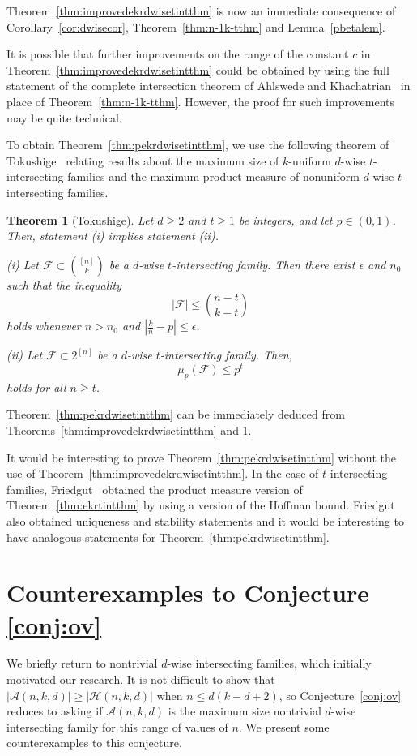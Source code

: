 \documentclass[12pt]{article}
\newtheorem{theorem}{Theorem}
\theoremstyle{definition}
\newcommand{\cH}{\mathcal{H}}
\newcommand{\cA}{\mathcal{A}}
\newcommand{\cF}{\mathcal{F}}
\begin{document}
Theorem~\ref{thm:improvedekrdwisetintthm} is now an immediate consequence of Corollary~\ref{cor:dwisecor}, Theorem~\ref{thm:n-1k-tthm} and Lemma~\ref{pbetalem}. 

It is possible that further improvements on the range of the constant $c$ in Theorem~\ref{thm:improvedekrdwisetintthm} could be obtained by using the full statement of the complete intersection theorem of Ahlswede and Khachatrian~\cite{AK1, AK3} in place of Theorem~\ref{thm:n-1k-tthm}. However, the proof for such improvements may be quite technical. 

To obtain Theorem~\ref{thm:pekrdwisetintthm}, we use the following theorem of Tokushige~\cite[Theorem~1]{Tok1} relating results about the maximum size of $k$-uniform $d$-wise $t$-intersecting families and the maximum product measure of nonuniform $d$-wise $t$-intersecting families. 

\begin{theorem}[Tokushige]\label{thm:tokthm}
Let $d\ge 2$ and $t\ge 1$ be integers, and let $p \in (0, 1)$. Then, statement (i) implies statement (ii).

(i) Let $\cF \subset \binom{[n]}{k}$ be a $d$-wise $t$-intersecting family. Then there exist $\epsilon$ and $n_0$ such that the inequality
\[|\cF| \le \binom{n-t}{k-t}\]
holds whenever $n > n_0$ and $|\frac{k}{n} - p| \le \epsilon$.

(ii) Let $\cF \subset 2^{[n]}$ be a $d$-wise $t$-intersecting family. Then,
\[\mu_p(\cF) \le p^t\]
holds for all $n\ge t$. 
\end{theorem}

Theorem~\ref{thm:pekrdwisetintthm} can be immediately deduced from Theorems~\ref{thm:improvedekrdwisetintthm} and \ref{thm:tokthm}. 

It would be interesting to prove Theorem~\ref{thm:pekrdwisetintthm} without the use of Theorem~\ref{thm:improvedekrdwisetintthm}. In the case of $t$-intersecting families, Friedgut~\cite{Fried} obtained the product measure version of Theorem~\ref{thm:ekrtintthm} by using a version of the Hoffman bound. Friedgut also obtained uniqueness and stability statements and it would be interesting to have analogous statements for Theorem~\ref{thm:pekrdwisetintthm}. 

\section{Counterexamples to Conjecture \ref{conj:ov}}

We briefly return to nontrivial $d$-wise intersecting families, which initially motivated our research. It is not difficult to show that $|\cA(n, k, d)| \ge |\cH(n, k, d)|$ when $n\le d(k-d+2)$, so Conjecture~\ref{conj:ov} reduces to asking if $\cA(n, k, d)$ is the maximum size nontrivial $d$-wise intersecting family for this range of values of $n$. We present some counterexamples to this conjecture. 
\end{document}
